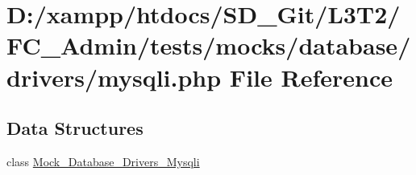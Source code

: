 \hypertarget{_admin_2tests_2mocks_2database_2drivers_2mysqli_8php}{}\section{D\+:/xampp/htdocs/\+S\+D\+\_\+\+Git/\+L3\+T2/\+F\+C\+\_\+\+Admin/tests/mocks/database/drivers/mysqli.php File Reference}
\label{_admin_2tests_2mocks_2database_2drivers_2mysqli_8php}
\subsection*{Data Structures}
\begin{DoxyCompactItemize}
\item 
class \hyperlink{class_mock___database___drivers___mysqli}{Mock\+\_\+\+Database\+\_\+\+Drivers\+\_\+\+Mysqli}
\end{DoxyCompactItemize}
